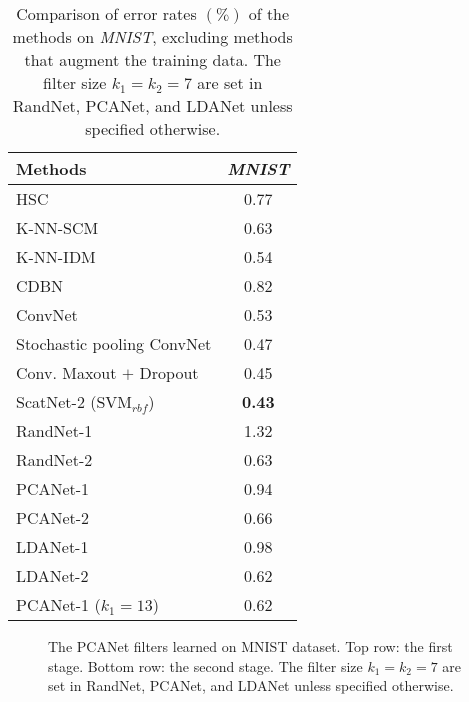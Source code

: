 \documentclass[10pt,journal,compsoc]{IEEEtran}
\begin{document}
\begin{table}[htbp]\centering
\caption{Comparison of error rates $(\%)$ of the methods on {\em MNIST}, excluding methods that augment the training data. The filter size $k_1 = k_2 = 7$ are set in RandNet, PCANet, and LDANet unless specified otherwise.}
\begin{tabular}{l|c}
  \hline
Methods           & {\it MNIST} \\  \hline \hline
  HSC \cite{Yu2011}  &    0.77  \\
  K-NN-SCM \cite{Belongie2002} &  0.63 \\
  K-NN-IDM \cite{Keysers2007} & 0.54 \\
  CDBN \cite{Lee2009}           & 0.82  \\
  ConvNet \cite{Jarrett2009}          & 0.53  \\
  Stochastic pooling ConvNet \cite{Zeiler2013} & 0.47   \\
  Conv. Maxout $+$ Dropout \cite{Goodfellow2013} & 0.45   \\
  ScatNet-2 (SVM$_{rbf}$) \cite{Bruna2013}      & {\bf 0.43}  \\ \hline
  RandNet-1 &  1.32 \\
  RandNet-2 &  0.63 \\
  PCANet-1    & 0.94  \\
  PCANet-2    & 0.66  \\
  LDANet-1   & 0.98 \\
  LDANet-2  &  0.62 \\ \hline
  PCANet-1 ($k_1 = 13$) & 0.62 \\
\hline
\end{tabular}\label{table: mnist_standard}
\end{table}



\begin{figure}[t]
\centering
{}
\caption{The PCANet filters learned on MNIST dataset. Top row: the first stage. Bottom row: the second stage. The filter size $k_1 = k_2 = 7$ are set in RandNet, PCANet, and LDANet unless specified otherwise.}\label{fig: MNIST_filter}
\end{figure}
\end{document}
